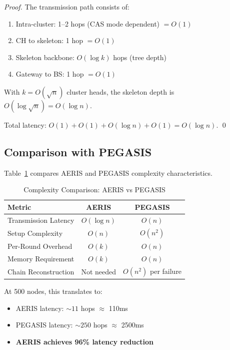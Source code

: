 \begin{proof}
The transmission path consists of:
\begin{enumerate}
    \item Intra-cluster: 1--2 hops (CAS mode dependent) $= O(1)$
    \item CH to skeleton: 1 hop $= O(1)$
    \item Skeleton backbone: $O(\log k)$ hops (tree depth)
    \item Gateway to BS: 1 hop $= O(1)$
\end{enumerate}

With $k = O(\sqrt{n})$ cluster heads, the skeleton depth is
$O(\log \sqrt{n}) = O(\log n)$.

Total latency: $O(1) + O(1) + O(\log n) + O(1) = O(\log n)$. \qed
\end{proof}

\subsection{Comparison with PEGASIS}

Table~\ref{tab:complexity_comparison} compares AERIS and PEGASIS
complexity characteristics.

\begin{table}[htbp]
\centering
\caption{Complexity Comparison: AERIS vs PEGASIS}
\label{tab:complexity_comparison}
\begin{tabular}{@{}lcc@{}}
\toprule
Metric & AERIS & PEGASIS \\
\midrule
Transmission Latency & $O(\log n)$ & $O(n)$ \\
Setup Complexity & $O(n)$ & $O(n^2)$ \\
Per-Round Overhead & $O(k)$ & $O(n)$ \\
Memory Requirement & $O(k)$ & $O(n)$ \\
Chain Reconstruction & Not needed & $O(n^2)$ per failure \\
\bottomrule
\end{tabular}
\end{table}

At 500 nodes, this translates to:
\begin{itemize}
    \item AERIS latency: $\sim 11$ hops $\approx$ 110ms
    \item PEGASIS latency: $\sim 250$ hops $\approx$ 2500ms
    \item \textbf{AERIS achieves 96\% latency reduction}
\end{itemize}
